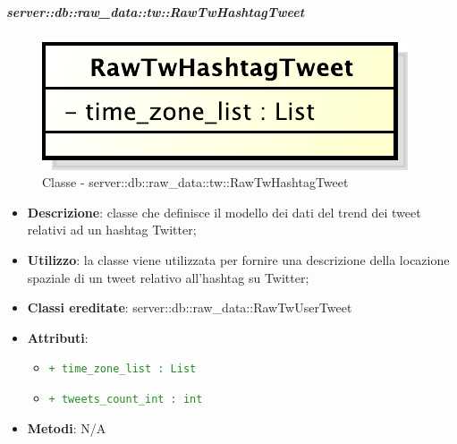 		\subparagraph{server::db::raw\_data::tw::RawTwHashtagTweet} %
		\label{subp:server_db_raw_data_tw_rawtwhashtagtweet}
			\begin{figure}[htbp]
				\centering
				\centerline{\includegraphics[scale=0.75]{./images/server/classes/db/raw_tw_hashtag_tweet.pdf}}
				\caption{Classe - server::db::raw\_data::tw::RawTwHashtagTweet}
			\end{figure}
			\begin{itemize}
				\item \textbf{Descrizione}: classe che definisce il modello dei dati del trend dei tweet relativi ad un hashtag Twitter;
				\item \textbf{Utilizzo}: la classe viene utilizzata per fornire una descrizione della locazione spaziale di un tweet relativo all'hashtag su Twitter;
				\item \textbf{Classi ereditate}: server::db::raw\_data::RawTwUserTweet
				\item \textbf{Attributi}:
					\begin{itemize}
						\item \textcolor{forestgreen}{\texttt{+ time\_zone\_list : List}}
						\item \textcolor{forestgreen}{\texttt{+ tweets\_count\_int : int}}
					\end{itemize}
				\item \textbf{Metodi}: N/A
			\end{itemize}


